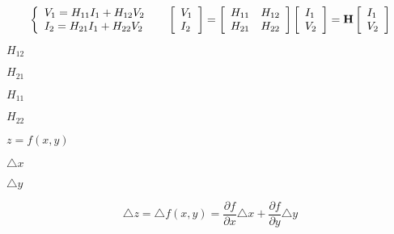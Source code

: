 {\newpage\clearpage
{}%
\begin{displaymath}\left\{ \begin{array}{l} 
    V_1=H_{11}I_1+H_{12}V_2 \\
    I_2=H_{21}I_1+H_{22}V_2 \end{array} \right.\;\;\;\;\;
  \left[ \begin{array}{l} V_1 \\I_2\end{array} \right]=
  \left[ \begin{array}{ll} H_{11} & H_{12}\\H_{21} & H_{22}\end{array}\right]
  \left[ \begin{array}{l} I_1 \\V_2\end{array} \right]
  ={\bf H}\left[ \begin{array}{l} I_1 \\V_2\end{array} \right]  \end{displaymath}%
\lthtmldisplayZ
\lthtmlcheckvsize\clearpage}

{\newpage\clearpage
{}%
$H_{12}$%
\lthtmlinlinemathZ
\lthtmlcheckvsize\clearpage}

{\newpage\clearpage
{}%
$H_{21}$%
\lthtmlinlinemathZ
\lthtmlcheckvsize\clearpage}

{\newpage\clearpage
{}%
$H_{11}$%
\lthtmlinlinemathZ
\lthtmlcheckvsize\clearpage}

{\newpage\clearpage
{}%
$H_{22}$%
\lthtmlinlinemathZ
\lthtmlcheckvsize\clearpage}

{\newpage\clearpage
{}%
$z=f(x,y)$%
\lthtmlinlinemathZ
\lthtmlcheckvsize\clearpage}

{\newpage\clearpage
{}%
$\triangle x$%
\lthtmlinlinemathZ
\lthtmlcheckvsize\clearpage}

{\newpage\clearpage
{}%
$\triangle y$%
\lthtmlinlinemathZ
\lthtmlcheckvsize\clearpage}

{\newpage\clearpage
{}%
\begin{displaymath} \triangle z=\triangle f(x,y)=\frac{\partial f}{\partial x}\triangle x +
                    \frac{\partial f}{\partial y}\triangle y  \end{displaymath}%
\lthtmldisplayZ
\lthtmlcheckvsize\clearpage}

